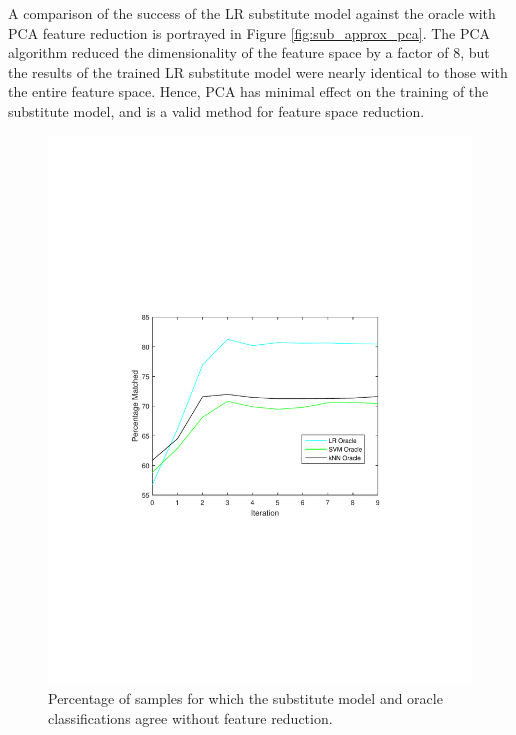 A comparison of the success of the LR substitute model against the oracle with PCA feature reduction is portrayed in Figure \ref{fig:sub_approx_pca}. The PCA algorithm reduced the dimensionality of the feature space by a factor of 8, but the results of the trained LR substitute model were nearly identical to those with the entire feature space. Hence, PCA has minimal effect on the training of the substitute model, and is a valid method for feature space reduction. 

\begin{figure}
	\centering
	\begin{minipage}{0.42\linewidth}
		\centering
		\includegraphics[width =\linewidth, trim = 110 240 120 255, clip]{figs/final_fig_1.pdf}
		\caption{Percentage of samples for which the substitute model and oracle classifications agree without feature reduction.}
		\label{fig:sub_approx}
	\end{minipage}
	\qquad
	\begin{minipage}{0.42\linewidth}
		\centering

\end{minipage}
\end{figure}
